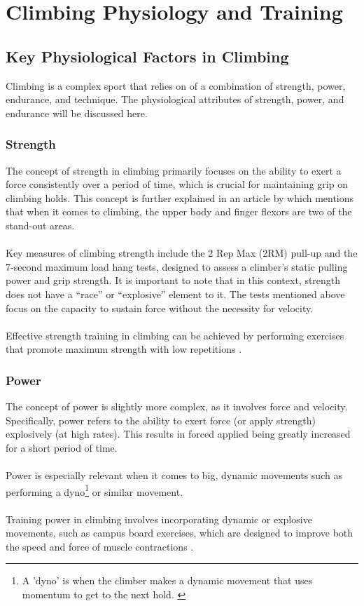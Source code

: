 \chapter{Climbing Physiology and Training}
\label{chap:climbing_performance}

\section{Key Physiological Factors in Climbing}

Climbing is a complex sport that relies on of a combination of strength, power, endurance, and technique. The physiological attributes of strength, power, and endurance will be discussed here.

\subsection{Strength}
The concept of strength in climbing primarily focuses on the ability to exert a force consistently over a period of time, which is crucial for maintaining grip on climbing holds. This concept is further explained in an article by \citep{MaddyCope-2022} which mentions that when it comes to climbing, the upper body and finger flexors are two of the stand-out areas. \\\\
Key measures of climbing strength include the 2 Rep Max (2RM) pull-up and the 7-second maximum load hang tests, designed to assess a climber's static pulling power and grip strength. It is important to note that in this context, strength does not have a “race” or “explosive” element to it. The tests mentioned above focus on the capacity to sustain force without the necessity for velocity.\\\\
Effective strength training in climbing can be achieved by performing exercises that promote maximum strength with low repetitions \citep{Consuegra-2023}.

\subsection{Power}
The concept of power is slightly more complex, as it involves force and velocity. Specifically, power refers to the ability to exert force (or apply strength) explosively (at high rates). This results in forced applied being greatly increased for a short period of time.\\\\
Power is especially relevant when it comes to big, dynamic movements such as performing a dyno\footnote{A 'dyno' is when the climber makes a dynamic movement that uses momentum to get to the next hold. \citep{lafabriqueverticale_2022}} or similar movement.\\\\
Training power in climbing involves incorporating dynamic or explosive movements, such as campus board exercises, which are designed to improve both the speed and force of muscle contractions \citep{Consuegra-2023}.

